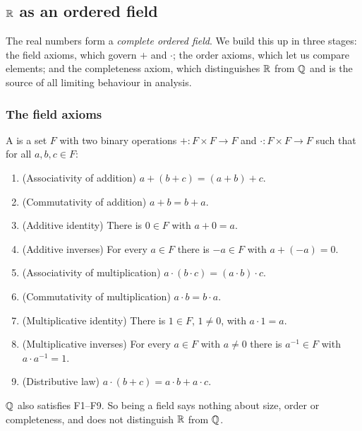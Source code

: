 \subsection{\texorpdfstring{$\mathbb{R}$}{R} as an ordered field}
The real numbers form a \emph{complete ordered field}. We build this up in
three stages: the field axioms, which govern $+$ and $\cdot$; the order
axioms, which let us compare elements; and the completeness axiom, which
distinguishes $\mathbb{R}$ from $\mathbb{Q}$ and is the source of all limiting behaviour in
analysis.

\subsubsection*{The field axioms}
\begin{defi}[Field]
  A  is a set $F$ with two binary operations
  $+ : F \times F \to F$ and $\cdot : F \times F \to F$ such that for all
  $a, b, c \in F$:
  \begin{enumerate}[label=\textbf{F\arabic*.}, leftmargin=2.5em]
    \item (Associativity of addition) $a + (b + c) = (a + b) + c$.
    \item (Commutativity of addition) $a + b = b + a$.
    \item (Additive identity) There is $0 \in F$ with $a + 0 = a$.
    \item (Additive inverses) For every $a \in F$ there is $-a \in F$ with $a + (-a) = 0$.
    \item (Associativity of multiplication) $a \cdot (b \cdot c) = (a \cdot b) \cdot c$.
    \item (Commutativity of multiplication) $a \cdot b = b \cdot a$.
    \item (Multiplicative identity) There is $1 \in F$, $1 \neq 0$, with $a \cdot 1 = a$.
    \item (Multiplicative inverses) For every $a \in F$ with $a \neq 0$ there is $a^{-1} \in F$ with $a \cdot a^{-1} = 1$.
    \item (Distributive law) $a \cdot (b + c) = a \cdot b + a \cdot c$.
  \end{enumerate}
\end{defi}

\begin{eg}
  $\mathbb{Q}$ also satisfies F1--F9. So being a field says nothing about size,
  order or completeness, and does not distinguish $\mathbb{R}$ from $\mathbb{Q}$.
\end{eg}

